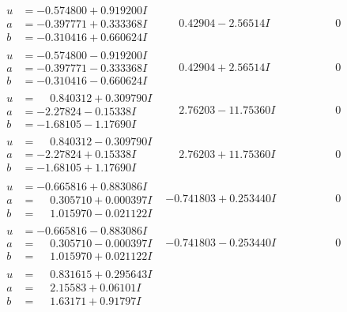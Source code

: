 \documentclass[1p]{elsarticle_modified}
\theoremstyle{definition}
\begin{document}
$$\begin{array}{c|c|c}
\begin{aligned}
u &= -0.574800 + 0.919200 I \\
a &= -0.397771 + 0.333368 I \\
b &= -0.310416 + 0.660624 I\end{aligned}
 & \phantom{-}0.42904 - 2.56514 I & \phantom{-0.000000 } 0 \\ \hline\begin{aligned}
u &= -0.574800 - 0.919200 I \\
a &= -0.397771 - 0.333368 I \\
b &= -0.310416 - 0.660624 I\end{aligned}
 & \phantom{-}0.42904 + 2.56514 I & \phantom{-0.000000 } 0 \\ \hline\begin{aligned}
u &= \phantom{-}0.840312 + 0.309790 I \\
a &= -2.27824 - 0.15338 I \\
b &= -1.68105 - 1.17690 I\end{aligned}
 & \phantom{-}2.76203 - 11.75360 I & \phantom{-0.000000 } 0 \\ \hline\begin{aligned}
u &= \phantom{-}0.840312 - 0.309790 I \\
a &= -2.27824 + 0.15338 I \\
b &= -1.68105 + 1.17690 I\end{aligned}
 & \phantom{-}2.76203 + 11.75360 I & \phantom{-0.000000 } 0 \\ \hline\begin{aligned}
u &= -0.665816 + 0.883086 I \\
a &= \phantom{-}0.305710 + 0.000397 I \\
b &= \phantom{-}1.015970 - 0.021122 I\end{aligned}
 & -0.741803 + 0.253440 I & \phantom{-0.000000 } 0 \\ \hline\begin{aligned}
u &= -0.665816 - 0.883086 I \\
a &= \phantom{-}0.305710 - 0.000397 I \\
b &= \phantom{-}1.015970 + 0.021122 I\end{aligned}
 & -0.741803 - 0.253440 I & \phantom{-0.000000 } 0 \\ \hline\begin{aligned}
u &= \phantom{-}0.831615 + 0.295643 I \\
a &= \phantom{-}2.15583 + 0.06101 I \\
b &= \phantom{-}1.63171 + 0.91797 I\end{aligned}

\end{array}$$
\end{document}
